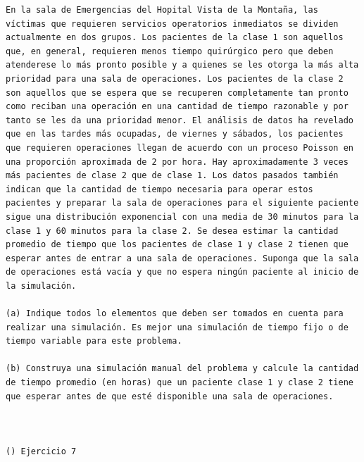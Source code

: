 \begin{verbatim}
En la sala de Emergencias del Hopital Vista de la Montaña, las víctimas que requieren servicios operatorios inmediatos se dividen actualmente en dos grupos. Los pacientes de la clase 1 son aquellos que, en general, requieren menos tiempo quirúrgico pero que deben atenderese lo más pronto posible y a quienes se les otorga la más alta prioridad para una sala de operaciones. Los pacientes de la clase 2 son aquellos que se espera que se recuperen completamente tan pronto como reciban una operación en una cantidad de tiempo razonable y por tanto se les da una prioridad menor. El análisis de datos ha revelado que en las tardes más ocupadas, de viernes y sábados, los pacientes que requieren operaciones llegan de acuerdo con un proceso Poisson en una proporción aproximada de 2 por hora. Hay aproximadamente 3 veces más pacientes de clase 2 que de clase 1. Los datos pasados también indican que la cantidad de tiempo necesaria para operar estos pacientes y preparar la sala de operaciones para el siguiente paciente sigue una distribución exponencial con una media de 30 minutos para la clase 1 y 60 minutos para la clase 2. Se desea estimar la cantidad promedio de tiempo que los pacientes de clase 1 y clase 2 tienen que esperar antes de entrar a una sala de operaciones. Suponga que la sala de operaciones está vacía y que no espera ningún paciente al inicio de la simulación.

(a) Indique todos lo elementos que deben ser tomados en cuenta para realizar una simulación. Es mejor una simulación de tiempo fijo o de tiempo variable para este problema.

(b) Construya una simulación manual del problema y calcule la cantidad de tiempo promedio (en horas) que un paciente clase 1 y clase 2 tiene que esperar antes de que esté disponible una sala de operaciones.



() Ejercicio 7


\end{verbatim}
